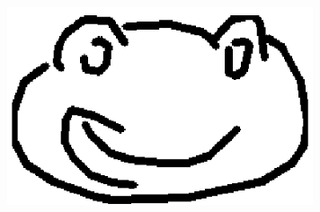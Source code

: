 \begin{center}
\includegraphics[width=9cm,height=9cm,keepaspectratio]{figures/frog_draw_4.png}


\end{center}




























